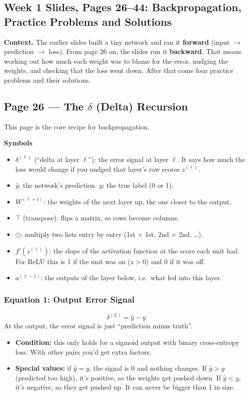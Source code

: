 \subsection*{Week 1 Slides, Pages 26--44: Backpropagation, Practice Problems and Solutions}

\textbf{Context.} The earlier slides built a tiny network and ran it \textbf{forward} (input $\to$ prediction $\to$ loss). From page 26 on, the slides run it \textbf{backward}. That means working out how much each weight was to blame for the error, nudging the weights, and checking that the loss went down. After that come four practice problems and their solutions.

\subsection*{Page 26 --- The $\delta$ (Delta) Recursion}

This page is the core recipe for backpropagation.

\textbf{Symbols}
\begin{itemize}[leftmargin=*]
  \item $\delta^{(\ell)}$ (``delta at layer $\ell$''): the error signal at layer $\ell$. It says how much the loss would change if you nudged that layer's raw scores $z^{(\ell)}$.
  \item $\hat{y}$: the network's prediction. $y$: the true label (0 or 1).
  \item $W^{(\ell+1)}$: the weights of the next layer up, the one closer to the output.
  \item $\top$ (transpose): flips a matrix, so rows become columns.
  \item $\odot$: multiply two lists entry by entry (1st $\times$ 1st, 2nd $\times$ 2nd, \ldots).
  \item $f'(z^{(\ell)})$: the slope of the activation function at the score each unit had. For ReLU this is 1 if the unit was on ($z>0$) and 0 if it was off.
  \item $a^{(\ell-1)}$: the outputs of the layer below, i.e.\ what fed into this layer.
\end{itemize}

\subsubsection*{Equation 1: Output Error Signal}
\[
\delta^{(L)} = \hat{y} - y
\]
At the output, the error signal is just ``prediction minus truth''.
\begin{itemize}[leftmargin=*]
  \item \textbf{Condition:} this only holds for a sigmoid output with binary cross-entropy loss. With other pairs you'd get extra factors.
  \item \textbf{Special values:} if $\hat{y}=y$, the signal is 0 and nothing changes. If $\hat{y}>y$ (predicted too high), it's positive, so the weights get pushed down. If $\hat{y}<y$, it's negative, so they get pushed up. It can never be bigger than 1 in size.
\end{itemize}

